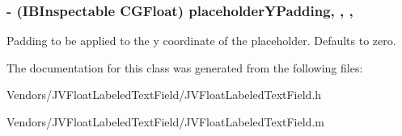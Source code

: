 \subsubsection[{placeholder\+Y\+Padding}]{\setlength{\rightskip}{0pt plus 5cm}-\/ (I\+B\+Inspectable C\+G\+Float) placeholder\+Y\+Padding\hspace{0.3cm}{\ttfamily [read]}, {\ttfamily [write]}, {\ttfamily [nonatomic]}, {\ttfamily [assign]}}\label{interface_j_v_float_labeled_text_field_a503fcd34a364088ba893cd491123ef48}
Padding to be applied to the y coordinate of the placeholder. Defaults to zero. 

The documentation for this class was generated from the following files\+:\begin{DoxyCompactItemize}
\item 
Vendors/\+J\+V\+Float\+Labeled\+Text\+Field/J\+V\+Float\+Labeled\+Text\+Field.\+h\item 
Vendors/\+J\+V\+Float\+Labeled\+Text\+Field/J\+V\+Float\+Labeled\+Text\+Field.\+m\end{DoxyCompactItemize}
